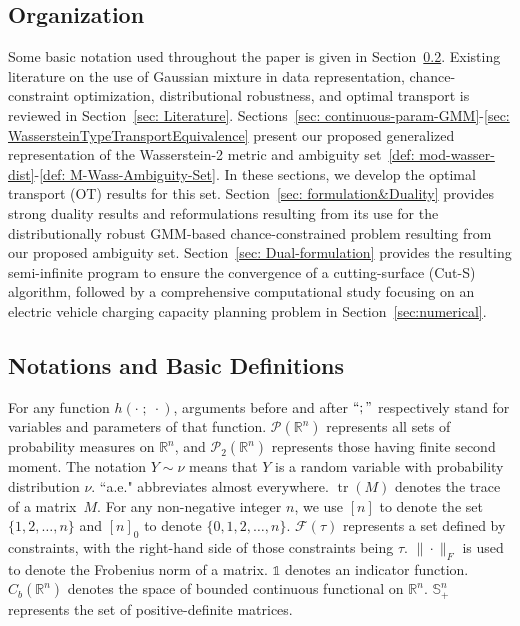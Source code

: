 \documentclass[opre,sglanonrev]{informs4}
\newcommand{\mF}{\mathcal{F}}
\newcommand{\mP}{\mathcal{P}}
\newcommand{\mbR}{\mathbb R}
\newcommand{\mbB}{\mathbb{B}}
\newcommand{\mbS}{\mathbb S}
\newcommand{\ind}{\mathds{1}}
\newcommand{\Tr}{\operatorname{tr}}
\begin{document}
\subsection{Organization}
Some basic notation used throughout the paper is given in Section~\ref{sec:NotationsAndBasicDefinitions}. Existing literature on the use of Gaussian mixture in data representation, chance-constraint optimization, distributional robustness, and optimal transport is reviewed in Section~\ref{sec: Literature}. Sections~\ref{sec: continuous-param-GMM}-\ref{sec: WassersteinTypeTransportEquivalence} present our proposed generalized representation of the Wasserstein-2 metric and ambiguity set~\eqref{def: mod-wasser-dist}-\eqref{def: M-Wass-Ambiguity-Set}. In these sections, we develop the optimal transport (OT) results for this set. Section~\ref{sec: formulation&Duality} provides strong duality results and reformulations resulting from its use for the distributionally robust GMM-based chance-constrained problem resulting from our proposed ambiguity set. Section~\ref{sec: Dual-formulation} provides the resulting semi-infinite program to ensure the convergence of a cutting-surface (Cut-S) algorithm, followed by a comprehensive computational study focusing on an electric vehicle charging capacity planning problem in Section~\ref{sec:numerical}.

\subsection{Notations and Basic Definitions}\label{sec:NotationsAndBasicDefinitions}
 For any function $h(\cdot \;;\;\cdot)$, arguments before and after $``;"$ respectively stand for variables and parameters of that function.  $\mP(\mbR^n)$ represents all sets of probability measures on $\mbR^n$, and $\mP_2(\mbR^n)$ represents those having finite second moment.   The notation $Y\sim\nu$ means that $Y$ is a random variable with probability distribution $\nu$. ``a.e." abbreviates almost everywhere. $\Tr(M)$ denotes the trace of a matrix~$M$. 
For any non-negative integer $n$, we use $[n]$ to denote the set $\{1, 2, \ldots, n\}$ and $[n]_0$ to denote $\{0, 1, 2, \ldots, n\}$. $\mF(\mathtt{\tau})$ represents a set defined by constraints, with the right-hand side of those constraints being $\tau$. 
$\|\cdot\|_F$ is used to denote the Frobenius norm of a matrix. $\ind$ denotes an indicator function. $C_b(\mbR^n)$ denotes the space of bounded continuous functional on $\mbR^n$. $\mbS^n_+$ represents the set of positive-definite matrices. 
\end{document}
